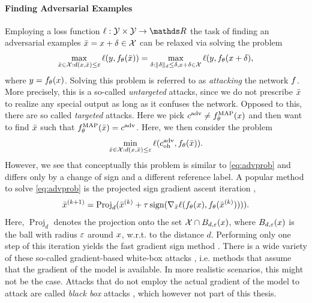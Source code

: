 \paragraph{Finding Adversarial Examples} Employing a loss function $\ell:\Oup\times\Oup\to\R$ the task of finding an adversarial examples $\bar{x}=x+\delta\in\mathcal{X}$ can be relaxed via solving the problem
%
\begin{align}\label{eq:advprob}
\max_{\bar{x}\in \mathcal{X}:d(x,\bar{x})\leq \varepsilon} \ell(y, f_\theta(\bar{x}))
=
\max_{\delta:\|\delta\|_d\leq\delta, x+\delta\in\mathcal{X}}
\ell(y, f_\theta(x+\delta),
\end{align}
%
where $y=f_\theta(x)$. Solving this problem is referred to as \emph{attacking} the network $f$. More precisely, this is a so-called \emph{untargeted} attacks, since we do not prescribe $\bar{x}$ to realize any special output as long as it confuses the network. Opposed to this, there are so called \emph{targeted} attacks. Here we pick $c^{\operatorname{adv}} \neq f^{\operatorname{MAP}}_\theta(x)$ and then want to find $\bar{x}$ such that $f^{\operatorname{MAP}}_\theta(\bar{x}) = c^{\operatorname{adv}}$. Here, we then consider the problem
%
\begin{align*}
\min_{\bar{x}\in \mathcal{X}:d(x,\bar{x})\leq \varepsilon} \ell(c^{\operatorname{adv}}_{{\operatorname{oh}}}, f_\theta(\bar{x})).
\end{align*}
%
%
However, we see that conceptually this problem is similar to \cref{eq:advprob} and differs only by a change of sign and a different reference label.
%
A popular method to solve \cref{eq:advprob} is the projected sign gradient ascent iteration \cite{kurakin2016adversarial},
%
\begin{align*}
\bar{x}^{(k+1)} = \operatorname{Proj}_d(\bar{x}^{(k)} + \tau \operatorname*{sign}(\nabla_{\bar{x}}
\ell(f_\theta(x), f_\theta(\bar{x}^{(k)})))).
\end{align*}
%
%
%
Here, $\operatorname{Proj}_d$ denotes the projection onto the set $\mathcal{X}\cap B_{d,\varepsilon}(x)$, where $B_{d,\varepsilon}(x)$ is the ball with radius $\varepsilon$ around $x$, w.r.t. to the distance $d$. Performing only one step of this iteration yields the fast gradient sign method \cite{goodfellow2014explaining}. There is a wide variety of these so-called gradient-based white-box attacks \cite{yuan2019adversarial}, i.e. methods that assume that the gradient of the model is available. In more realistic scenarios, this might not be the case. Attacks that do not employ the actual gradient of the model to attack are called \emph{black box} attacks \cite{ilyas2018black}, which however not part of this thesis.
%
%
